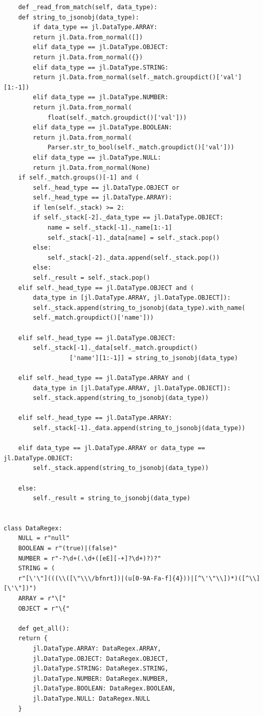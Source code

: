 \documentclass[11pt]{article}
\begin{document}
\begin{lstlisting}
    def _read_from_match(self, data_type):
	def string_to_jsonobj(data_type):
	    if data_type == jl.DataType.ARRAY:
		return jl.Data.from_normal([])
	    elif data_type == jl.DataType.OBJECT:
		return jl.Data.from_normal({})
	    elif data_type == jl.DataType.STRING:
		return jl.Data.from_normal(self._match.groupdict()['val'][1:-1])
	    elif data_type == jl.DataType.NUMBER:
		return jl.Data.from_normal(
		    float(self._match.groupdict()['val']))
	    elif data_type == jl.DataType.BOOLEAN:
		return jl.Data.from_normal(
		    Parser.str_to_bool(self._match.groupdict()['val']))
	    elif data_type == jl.DataType.NULL:
		return jl.Data.from_normal(None)
	if self._match.groups()[-1] and (
		self._head_type == jl.DataType.OBJECT or
		self._head_type == jl.DataType.ARRAY):
	    if len(self._stack) >= 2:
		if self._stack[-2]._data_type == jl.DataType.OBJECT:
		    name = self._stack[-1]._name[1:-1]
		    self._stack[-1]._data[name] = self._stack.pop()
		else:
		    self._stack[-2]._data.append(self._stack.pop())
	    else:
		self._result = self._stack.pop()
	elif self._head_type == jl.DataType.OBJECT and (
		data_type in [jl.DataType.ARRAY, jl.DataType.OBJECT]):
	    self._stack.append(string_to_jsonobj(data_type).with_name(
		self._match.groupdict()['name']))

	elif self._head_type == jl.DataType.OBJECT:
	    self._stack[-1]._data[self._match.groupdict()
				  ['name'][1:-1]] = string_to_jsonobj(data_type)

	elif self._head_type == jl.DataType.ARRAY and (
		data_type in [jl.DataType.ARRAY, jl.DataType.OBJECT]):
	    self._stack.append(string_to_jsonobj(data_type))

	elif self._head_type == jl.DataType.ARRAY:
	    self._stack[-1]._data.append(string_to_jsonobj(data_type))

	elif data_type == jl.DataType.ARRAY or data_type == jl.DataType.OBJECT:
	    self._stack.append(string_to_jsonobj(data_type))

	else:
	    self._result = string_to_jsonobj(data_type)


class DataRegex:
    NULL = r"null"
    BOOLEAN = r"(true)|(false)"
    NUMBER = r"-?\d+(.\d+([eE][-+]?\d+)?)?"
    STRING = (
	r"[\'\"](((\\([\"\\\/bfnrt])|(u[0-9A-Fa-f]{4}))|[^\'\"\\])*)([^\\][\'\"])")
    ARRAY = r"\["
    OBJECT = r"\{"

    def get_all():
	return {
	    jl.DataType.ARRAY: DataRegex.ARRAY,
	    jl.DataType.OBJECT: DataRegex.OBJECT,
	    jl.DataType.STRING: DataRegex.STRING,
	    jl.DataType.NUMBER: DataRegex.NUMBER,
	    jl.DataType.BOOLEAN: DataRegex.BOOLEAN,
	    jl.DataType.NULL: DataRegex.NULL
	}
\end{lstlisting}
\end{document}
